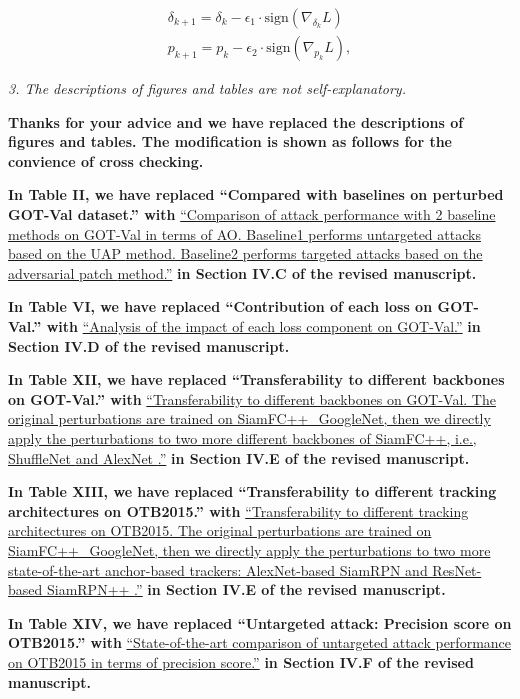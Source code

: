 \documentclass[12pt]{article}
\begin{document}
\begin{gather}
  \delta_{k+1} = \delta_{k} - \epsilon_1 \cdot \text{sign}(\nabla_{\delta_k}L)\\
  p_{k+1} = p_{k} - \epsilon_2 \cdot \text{sign}(\nabla_{p_k}L),
  \end{gather}

\textit{3. The descriptions of figures and tables are not self-explanatory.}

\textbf{Thanks for your advice and we have replaced the descriptions of figures and tables. The modification is shown as follows for the convience of cross checking.}

\textbf{In Table II, we have replaced ``Compared with baselines on perturbed GOT-Val dataset.'' with}
\uline{``Comparison of attack performance with 2 baseline methods on GOT-Val in terms of AO. Baseline1 performs untargeted attacks based on the UAP \cite{UAP} method. Baseline2 performs targeted attacks based on the adversarial patch \cite{patch} method.''}
\textbf{in Section IV.C of the revised manuscript.}

\textbf{In Table VI, we have replaced ``Contribution of each loss on GOT-Val.'' with}
\uline{``Analysis of the impact of each loss component on GOT-Val.''}
\textbf{in Section IV.D of the revised manuscript.}

\textbf{In Table XII, we have replaced ``Transferability to different backbones on GOT-Val.'' with}
\uline{``Transferability to different backbones on GOT-Val. The original perturbations are trained on SiamFC++\_GoogleNet, then we directly apply the perturbations to two more different backbones of SiamFC++, i.e., ShuffleNet \cite{ShuffleNet} and AlexNet \cite{AlexNet}.''}
\textbf{in Section IV.E of the revised manuscript.}

\textbf{In Table XIII, we have replaced ``Transferability to different tracking architectures on OTB2015.'' with}
\uline{``Transferability to different tracking architectures on OTB2015. The original perturbations are trained on SiamFC++\_GoogleNet, then we directly apply the perturbations to two more state-of-the-art anchor-based trackers: AlexNet-based SiamRPN \cite{SiamRPN} and ResNet-based SiamRPN++ \cite{SiamRPN++}.''}
\textbf{in Section IV.E of the revised manuscript.}

\textbf{In Table XIV, we have replaced ``Untargeted attack: Precision score on OTB2015.'' with}
\uline{``State-of-the-art comparison of untargeted attack performance on OTB2015 in terms of precision score.''}
\textbf{in Section IV.F of the revised manuscript.}
\end{document}
